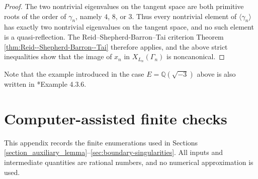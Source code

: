 \documentclass[11pt]{amsart}
\theoremstyle{plain}
\theoremstyle{definition}
\numberwithin{equation}{section}
\def\Q{{\mathbb Q}}
\begin{document}
\begin{proof}
The two nontrivial eigenvalues on the tangent space are both primitive
roots of the order of $\gamma_n$, namely $4$, $8$, or $3$.
Thus every nontrivial element of $\langle\gamma_n\rangle$
has exactly two nontrivial eigenvalues on the tangent space,
and no such element is a quasi-reflection.
The Reid--Shepherd-Barron--Tai criterion Theorem \ref{thm:Reid--Shepherd-Barron--Tai} therefore applies,
and the above strict inequalities show that the image of
$x_n$ in $X_{L_n}(\Gamma_n)$ is noncanonical.
\end{proof}
Note that the example introduced in the case $E=\Q(\sqrt{-3})$ above is also written in  \cite{watson2026singularities}*{Example 4.3.6}.

































\newpage
\appendix

\section{Computer-assisted finite checks}
\label{app:finite-computations}
\label{subsec:finite-computations}
\setcounter{algorithm}{0}
\renewcommand{\thealgorithm}{\thesection.\arabic{algorithm}}
\providecommand{\theHalgorithm}{\thealgorithm}
\renewcommand{\theHalgorithm}{appendix.\thesection.\arabic{algorithm}}
\setcounter{table}{0}
\renewcommand{\thetable}{\thesection.\arabic{table}}
\providecommand{\theHtable}{\thetable}
\renewcommand{\theHtable}{appendix.\thesection.\arabic{table}}

This appendix records the finite enumerations used in Sections \ref{section_auxiliary_lemma}--\ref{sec:boundary-singularities}. All inputs and intermediate quantities are rational numbers, and no numerical approximation is used.
\end{document}
